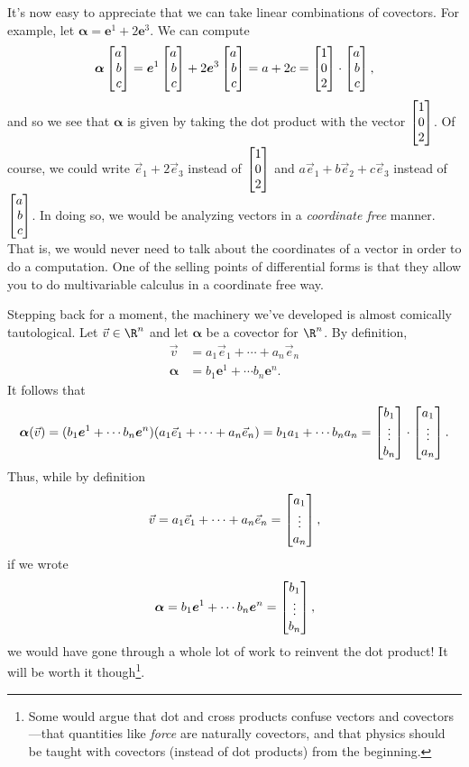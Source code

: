 It's now easy to appreciate that we can take linear combinations of covectors.
For example, let $\bm \alpha = \bm e^1+2\bm e^3$.  We can compute
\[
	\bm \alpha\mat{a\\b\\c} = \bm e^1\mat{a\\b\\c}
	+2\bm e^3\mat{a\\b\\c} = a+2c = \mat{1\\0\\2}\cdot \mat{a\\b\\c},
\]
and so we see that $\bm\alpha$ is given by taking the dot product with
the vector $\mat{1\\0\\2}$.  Of course, we could write $\vec e_1+2\vec e_3$
instead of $\mat{1\\0\\2}$ and $a\vec e_1+b\vec e_2+c\vec e_3$ instead of 
$\mat{a\\b\\c}$.  In doing so, we would be analyzing vectors in
a \emph{coordinate free} manner.  That is, we would never need to talk about
the coordinates of a vector in order to do a computation.  One of the selling points
of differential forms is that they allow you to do multivariable calculus
in a coordinate free way.

Stepping back for a moment, the machinery we've developed is almost comically
tautological.  Let $\vec v\in \R^n$ and let $\bm \alpha$ be a covector for $\R^n$.  By 
definition,
\begin{align*}
	\vec v &= a_1\vec e_1+\cdots +a_n\vec e_n\\
	\bm \alpha &= b_1\bm e^1+\cdots b_n\bm e^n.
\end{align*}
It follows that
\[
	\bm \alpha(\vec v) = 
	(b_1\bm e^1+\cdots b_n\bm e^n)(a_1\vec e_1+\cdots +a_n\vec e_n)
	=b_1a_1+\cdots b_na_n = \begin{bmatrix}b_1\\\vdots\\b_n\end{bmatrix}\cdot \begin{bmatrix}a_1\\\vdots\\
	a_n\end{bmatrix}.
\]
Thus, while by definition 
\[
\vec v=a_1\vec e_1+\cdots +a_n\vec e_n=
\begin{bmatrix}a_1\\\vdots\\a_n\end{bmatrix},\]
if we  wrote
\[
	\bm \alpha =b_1\bm e^1+\cdots b_n\bm e^n=
\begin{bmatrix}b_1\\\vdots\\b_n\end{bmatrix},\]
we would have gone through
a whole lot of work to reinvent the dot product!  It will be worth it 
though\footnote{ Some would argue that dot and cross products confuse
vectors and covectors---that quantities like \emph{force}
are naturally covectors, and that physics should be taught
with covectors (instead of dot products) from the beginning.}.



